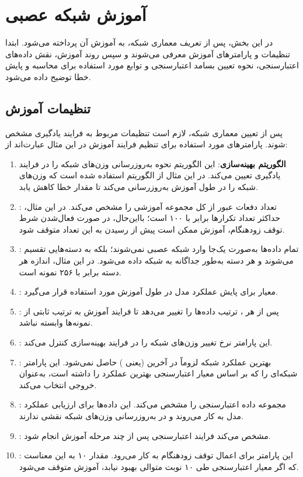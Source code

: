 \section{آموزش شبکه عصبی}
\label{sec:training}

در این بخش، پس از تعریف معماری شبکه، به آموزش آن پرداخته می‌شود. ابتدا تنظیمات و پارامترهای آموزش معرفی می‌شوند و سپس روند آموزش، نقش داده‌های اعتبارسنجی، نحوه تعیین بسامد اعتبارسنجی و توابع مورد استفاده برای محاسبه و پایش خطا توضیح داده می‌شود.

\subsection{تنظیمات آموزش}

پس از تعیین معماری شبکه، لازم است تنظیمات مربوط به فرایند یادگیری مشخص شوند. پارامترهای مورد استفاده برای تنظیم فرایند آموزش در این مثال عبارت‌اند از:

\begin{enumerate}
\item \textbf{الگوریتم بهینه‌سازی}: این الگوریتم نحوه به‌روزرسانی وزن‌های شبکه را در فرایند یادگیری تعیین می‌کند. در این مثال از الگوریتم  استفاده شده است که وزن‌های شبکه را در طول آموزش به‌روزرسانی می‌کند تا مقدار خطا کاهش یابد.
\item {}: تعداد دفعات عبور از کل مجموعه آموزشی را مشخص می‌کند. در این مثال، حداکثر تعداد تکرارها برابر با ۱۰۰ است؛ بااین‌حال، در صورت فعال‌شدن شرط توقف زودهنگام، آموزش ممکن است پیش از رسیدن به این تعداد متوقف شود.
\item {}: تمام داده‌ها به‌صورت یک‌جا وارد شبکه عصبی نمی‌شوند؛ بلکه به دسته‌هایی تقسیم می‌شوند و هر دسته به‌طور جداگانه به شبکه داده می‌شود. در این مثال، اندازه هر دسته برابر با ۲۵۶ نمونه است.
\item {}: معیار  برای پایش عملکرد مدل در طول آموزش مورد استفاده قرار می‌گیرد.
\item {}: پس از هر ، ترتیب داده‌ها را تغییر می‌دهد تا فرایند آموزش به ترتیب ثابتی از نمونه‌ها وابسته نباشد.
\item {}: این پارامتر نرخ تغییر وزن‌های شبکه را در فرایند بهینه‌سازی کنترل می‌کند.
\item {}: بهترین عملکرد شبکه لزوماً در آخرین  (یعنی ) حاصل نمی‌شود. این پارامتر شبکه‌ای را که بر اساس معیار اعتبارسنجی بهترین عملکرد را داشته است، به‌عنوان خروجی انتخاب می‌کند.
\item {}: مجموعه داده اعتبارسنجی را مشخص می‌کند. این داده‌ها برای ارزیابی عملکرد مدل به کار می‌روند و در به‌روزرسانی وزن‌های شبکه نقشی ندارند.
\item {}: مشخص می‌کند فرایند اعتبارسنجی پس از چند مرحله آموزش انجام شود.
\item {}: این پارامتر برای اعمال توقف زودهنگام به کار می‌رود. مقدار ۱۰ به این معناست که اگر معیار اعتبارسنجی طی ۱۰ نوبت متوالی بهبود نیابد، آموزش متوقف می‌شود.
\end{enumerate}

